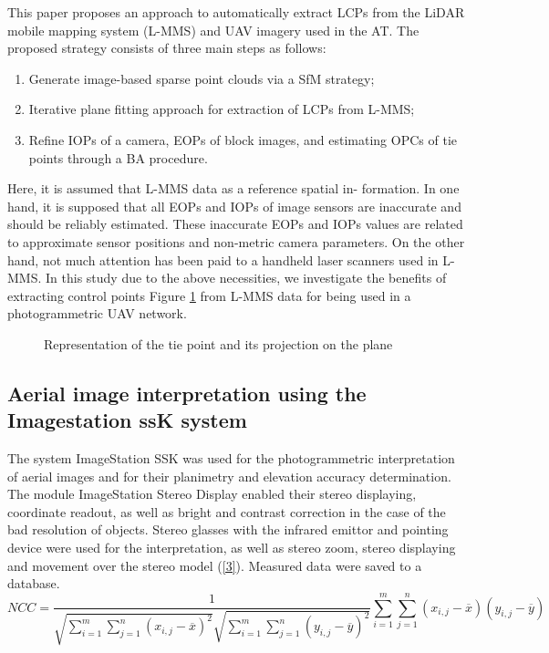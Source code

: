 \documentclass[12pt]{spieman}
\begin{document}
  This paper proposes an approach to automatically extract LCPs from the LiDAR mobile mapping system (L-MMS) and UAV imagery used in the AT. The proposed strategy consists of three main steps as follows: 
\begin{enumerate}
\item  Generate image-based sparse point clouds via a SfM strategy; 
\item  Iterative plane fitting approach for extraction of LCPs from L-MMS; 
\item  Refine IOPs of a camera, EOPs of block images, and estimating OPCs of tie points through a BA procedure. 
\end{enumerate}

Here, it is assumed that L-MMS data as a reference spatial in- formation. In one hand, it is supposed that all EOPs and IOPs of image sensors are inaccurate and should be reliably estimated. These inaccurate EOPs and IOPs values are related to approximate sensor positions and non-metric camera parameters. On the other hand, not much attention has been paid to a handheld laser scanners used in L-MMS. In this study due to the above necessities, we investigate the benefits of extracting control points Figure \ref{f1}  from L-MMS data for being used in a photogrammetric UAV network. 
\begin{figure}[H] 
\caption{Representation of the tie point and its projection on the plane}
\label{f1}
\end{figure}

\subsection{Aerial image interpretation using the Imagestation ssK system}
 The system ImageStation SSK was used for the photogrammetric interpretation of aerial images and for their planimetry and elevation accuracy determination. The module ImageStation Stereo Display enabled their stereo displaying, coordinate readout, as well as bright and contrast correction in the case of the bad resolution of objects. Stereo glasses with the infrared emittor and pointing device were used for the interpretation, as well as stereo zoom, stereo displaying and movement over the stereo model (\ref{3}). Measured data were saved to a database. 
\begin{equation}
NCC=\frac{1}{\sqrt{\sum\limits_{i=1}^m\sum\limits_{j=1}^n(x_{i,j}-\overline{x})^2}\sqrt{\sum\limits_{i=1}^m\sum\limits_{j=1}^n(y_{i,j}-\overline{y})^2}}{\sum\limits_{i=1}^m\sum\limits_{j=1}^n(x_{i,j}-\overline{x})(y_{i,j}-\overline{y})}\label{3}
\end{equation}
\end{document}
